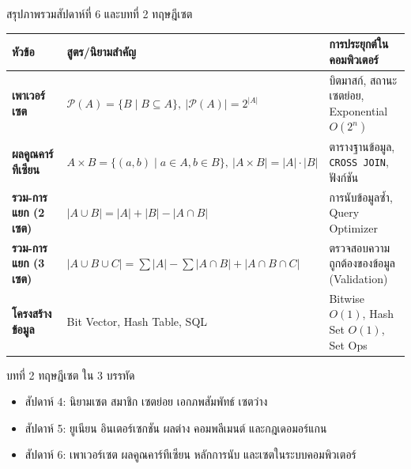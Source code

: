 \begin{frame}{สรุปภาพรวมสัปดาห์ที่ 6 และบทที่ 2 ทฤษฎีเซต}
  \begin{center}\small
  \begin{tabular}{|l|l|l|}
    \hline
    \textbf{หัวข้อ} & \textbf{สูตร/นิยามสำคัญ} & \textbf{การประยุกต์ในคอมพิวเตอร์} \\ \hline
    \textbf{เพาเวอร์เซต} & $\mathcal{P}(A) = \{B \mid B \subseteq A\}, \ |\mathcal{P}(A)| = 2^{|A|}$ & บิตมาสก์, สถานะเซตย่อย, Exponential $O(2^n)$ \\ \hline
    \textbf{ผลคูณคาร์ทีเซียน} & $A \times B = \{(a,b) \mid a \in A, b \in B\}, \ |A \times B| = |A|\cdot|B|$ & ตารางฐานข้อมูล, \texttt{CROSS JOIN}, ฟังก์ชัน \\ \hline
    \textbf{รวม-การแยก (2 เซต)} & $|A \cup B| = |A| + |B| - |A \cap B|$ & การนับข้อมูลซ้ำ, Query Optimizer \\ \hline
    \textbf{รวม-การแยก (3 เซต)} & $|A \cup B \cup C| = \sum |A| - \sum |A \cap B| + |A \cap B \cap C|$ & ตรวจสอบความถูกต้องของข้อมูล (Validation) \\ \hline
    \textbf{โครงสร้างข้อมูล} & Bit Vector, Hash Table, SQL & Bitwise $O(1)$, Hash Set $O(1)$, Set Ops \\ \hline
  \end{tabular}
  \end{center}
  \vspace{0.2em}
  \begin{exampleblock}{บทที่ 2 ทฤษฎีเซต ใน 3 บรรทัด}
    \begin{itemize}\small
      \item สัปดาห์ 4: นิยามเซต สมาชิก เซตย่อย เอกภพสัมพัทธ์ เซตว่าง
      \item สัปดาห์ 5: ยูเนียน อินเตอร์เซกชัน ผลต่าง คอมพลีเมนต์ และกฎเดอมอร์แกน
      \item สัปดาห์ 6: เพาเวอร์เซต ผลคูณคาร์ทีเซียน หลักการนับ และเซตในระบบคอมพิวเตอร์
    \end{itemize}
  \end{exampleblock}
\end{frame}

